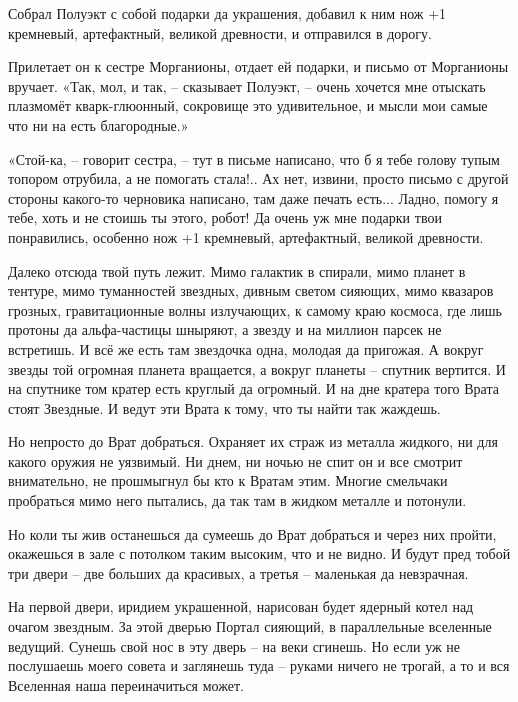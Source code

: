 \documentclass[ebook,oneside,final,openright]{memoir}
\begin{document}
\par
Собрал Полуэкт с собой подарки да украшения, добавил к ним нож +1 кремневый, артефактный, великой древности, и отправился в дорогу.\par
\par
Прилетает он к сестре Морганионы, отдает ей подарки, и письмо от Морганионы вручает. «Так, мол, и так, – сказывает Полуэкт, – очень хочется мне отыскать плазмомёт кварк-глюонный, сокровище это удивительное, и мысли мои самые что ни на есть благородные.»\par
\par
«Стой-ка, – говорит сестра, – тут в письме написано, что б я тебе голову тупым топором отрубила, а не помогать стала!.. Ах нет, извини, просто письмо с другой стороны какого-то черновика написано, там даже печать есть... Ладно, помогу я тебе, хоть и не стоишь ты этого, робот! Да очень уж мне подарки твои понравились, особенно нож +1 кремневый, артефактный, великой древности.\par
\par
Далеко отсюда твой путь лежит. Мимо галактик в спирали, мимо планет в тентуре, мимо туманностей звездных, дивным светом сияющих, мимо квазаров грозных, гравитационные волны излучающих, к самому краю космоса, где лишь протоны да альфа-частицы шныряют, а звезду и на миллион парсек не встретишь. И всё же есть там звездочка одна, молодая да пригожая. А вокруг звезды той огромная планета вращается, а вокруг планеты – спутник вертится. И на спутнике том кратер есть круглый да огромный. И на дне кратера того Врата стоят Звездные. И ведут эти Врата к тому, что ты найти так жаждешь.\par
\par
Но непросто до Врат добраться. Охраняет их страж из металла жидкого, ни для какого оружия не уязвимый. Ни днем, ни ночью не спит он и все смотрит внимательно, не прошмыгнул бы кто к Вратам этим. Многие смельчаки пробраться мимо него пытались, да так там в жидком металле и потонули.\par
\par
Но коли ты жив останешься да сумеешь до Врат добраться и через них пройти, окажешься в зале с потолком таким высоким, что и не видно. И будут пред тобой три двери – две больших да красивых, а третья – маленькая да невзрачная.\par
\par
На первой двери, иридием украшенной, нарисован будет ядерный котел над очагом звездным. За этой дверью Портал сияющий, в параллельные вселенные ведущий. Сунешь свой нос в эту дверь – на веки сгинешь. Но если уж не послушаешь моего совета и заглянешь туда – руками ничего не трогай, а то и вся Вселенная наша переиначиться может.\par
\end{document}
